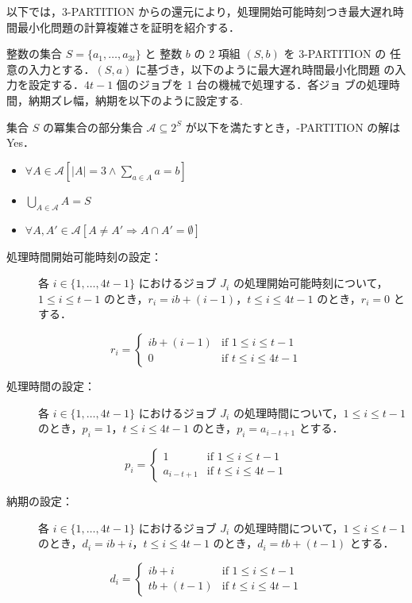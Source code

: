 \documentclass[12pt]{optlab-bachelor}
\begin{document}
以下では，\textsc{3-PARTITION} からの還元により，処理開始可能時刻つき最大遅れ時間最小化問題の計算複雑さを証明を紹介する．

整数の集合 $S = \{a_1,\ldots,a_{3t}\}$ と 整数 $b$ の 2 項組 $(S,b)$ を \textsc{3-PARTITION} の
任意の入力とする．$(S,a)$ に基づき，以下のように最大遅れ時間最小化問題
の入力を設定する．$4t - 1$ 個のジョブを 1 台の機械で処理する．各゙ジョ
ブの処理時間，納期ズレ幅，納期を以下のように設定する.

集合 $S$ の冪集合の部分集合 $\mathcal{A} \subseteq 2^{S}$ が以下を満たすとき，{-PARTITION} の解は Yes．
\begin{itemize}
  \item $\forall A \in \mathcal{A}[|A| = 3 \land \sum_{a \in A} a = b]$
  \item $\bigcup_{A \in \mathcal{A}} A = S$
  \item $\forall A, A' \in \mathcal{A}[A \neq A' \Rightarrow A \cap A' = \emptyset]$
\end{itemize}

\begin{description}
  \item[処理時間開始可能時刻の設定：] 各 $i \in \{1,\ldots,4t - 1\}$ におけるジョブ $J_i$ の処理開始可能時刻について，$1 \le i \le t - 1$ のとき，$r_i = ib + (i - 1)$，$t \le i \le 4t - 1$ のとき，$r_{i} = 0$ とする．
\end{description}
\begin{displaymath}
  r_i = \left\{ \begin{array}{ll} ib + (i - 1) & \text{if } 1 \le i \le t - 1 \\ 0 & \text{if } t \le i \le 4t - 1\end{array} \right.
\end{displaymath}
\begin{description}
  \item[処理時間の設定：] 各 $i \in \{1,\ldots,4t - 1\}$ におけるジョブ $J_i$ の処理時間について，$1 \le i \le t - 1$ のとき，$p_i = 1$，$t \le i \le 4t - 1$ のとき，$p_{i} = a_{i - t + 1}$ とする．
\end{description}
\begin{displaymath}
  p_i = \left\{ \begin{array}{ll} 1 & \text{if } 1 \le i \le t - 1 \\ a_{i - t + 1} & \text{if } t \le i \le 4t - 1\end{array} \right.
\end{displaymath}
\begin{description}
  \item[納期の設定：] 各 $i \in \{1,\ldots,4t - 1\}$ におけるジョブ $J_i$ の処理時間について，$1 \le i \le t - 1$ のとき，$d_i = ib + i$，$t \le i \le 4t - 1$ のとき，$d_i = tb + (t - 1)$ とする．
\end{description}
\begin{displaymath}
  d_i = \left\{ \begin{array}{ll} ib + i & \text{if } 1 \le i \le t - 1 \\ tb + (t - 1) & \text{if } t \le i \le 4t - 1\end{array} \right.
\end{displaymath}
\end{document}
